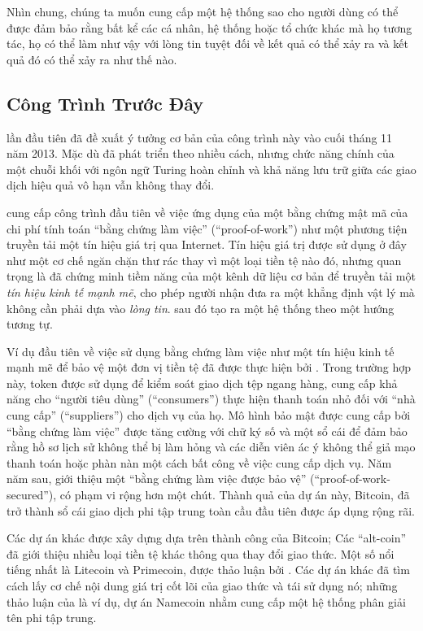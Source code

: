 \documentclass[9pt,oneside]{amsart}
\begin{document}
\begin{multicols}{2}
Nhìn chung, chúng ta muốn cung cấp một hệ thống sao cho người dùng có thể được đảm bảo rằng bất kể các cá nhân, hệ thống hoặc tổ chức khác mà họ tương tác, họ có thể làm như vậy với lòng tin tuyệt đối về kết quả có thể xảy ra và kết quả đó có thể xảy ra như thế nào.

\subsection{Công Trình Trước Đây} \label{ch:previous}

\cite{buterin2013ethereum} lần đầu tiên đã đề xuất ý tưởng cơ bản của công trình này vào cuối tháng 11 năm 2013. Mặc dù đã phát triển theo nhiều cách, nhưng chức năng chính của một chuỗi khối với ngôn ngữ Turing hoàn chỉnh và khả năng lưu trữ giữa các giao dịch hiệu quả vô hạn vẫn không thay đổi.

\cite{dwork92pricingvia} cung cấp công trình đầu tiên về việc ứng dụng của một bằng chứng mật mã của chi phí tính toán ``bằng chứng làm việc'' (``proof-of-work'') như một phương tiện truyền tải một tín hiệu giá trị qua Internet. Tín hiệu giá trị được sử dụng ở đây như một cơ chế ngăn chặn thư rác thay vì một loại tiền tệ nào đó, nhưng quan trọng là đã chứng minh tiềm năng của một kênh dữ liệu cơ bản để truyền tải một \textit{tín hiệu kinh tế mạnh mẽ}, cho phép người nhận đưa ra một khẳng định vật lý mà không cần phải dựa vào \textit{lòng tin}. \cite{back2002hashcash} sau đó tạo ra một hệ thống theo một hướng tương tự.

Ví dụ đầu tiên về việc sử dụng bằng chứng làm việc như một tín hiệu kinh tế mạnh mẽ để bảo vệ một đơn vị tiền tệ đã được thực hiện bởi \cite{vishnumurthy03karma:a}. Trong trường hợp này, token được sử dụng để kiểm soát giao dịch tệp ngang hàng, cung cấp khả năng cho ``người tiêu dùng'' (``consumers'') thực hiện thanh toán nhỏ đối với ``nhà cung cấp'' (``suppliers'') cho dịch vụ của họ. Mô hình bảo mật được cung cấp bởi ``bằng chứng làm việc'' được tăng cường với chữ ký số và một sổ cái để đảm bảo rằng hồ sơ lịch sử không thể bị làm hỏng và các diễn viên ác ý không thể giả mạo thanh toán hoặc phàn nàn một cách bất công về việc cung cấp dịch vụ. Năm năm sau, \cite{nakamoto2008bitcoin} giới thiệu một ``bằng chứng làm việc được bảo vệ'' (``proof-of-work-secured''), có phạm vi rộng hơn một chút. Thành quả của dự án này, Bitcoin, đã trở thành sổ cái giao dịch phi tập trung toàn cầu đầu tiên được áp dụng rộng rãi.

Các dự án khác được xây dựng dựa trên thành công của Bitcoin; Các ``alt-coin'' đã giới thiệu nhiều loại tiền tệ khác thông qua thay đổi giao thức. Một số nổi tiếng nhất là Litecoin và Primecoin, được thảo luận bởi \cite{sprankel2013technical}. Các dự án khác đã tìm cách lấy cơ chế nội dung giá trị cốt lõi của giao thức và tái sử dụng nó; những thảo luận của \cite{aron2012bitcoin} là ví dụ, dự án Namecoin nhằm cung cấp một hệ thống phân giải tên phi tập trung.


\end{multicols}
\end{document}

